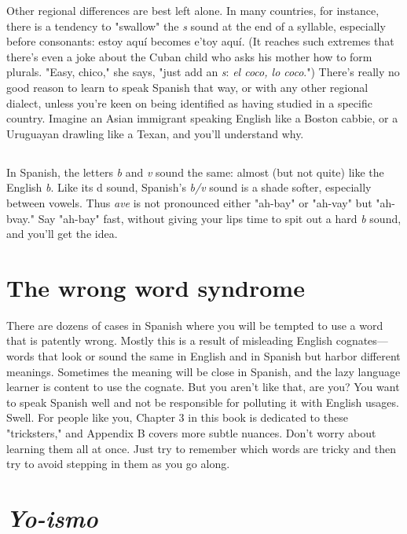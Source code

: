 \documentclass[14pt,a4paper,oneside]{memoir}
\begin{document}
Other regional differences are best left alone. In many
countries, for instance, there is a tendency to "swallow" the \emph{s} sound at
the end of a syllable, especially before consonants: estoy aquí becomes
e'toy aquí. (It reaches such extremes that there's even a joke about the
Cuban child who asks his mother how to form plurals. "Easy, chico,"
she says, "just add an \emph{s}: \emph{el coco, lo coco}.") There's really no good reason to learn to speak Spanish that way, or with any other regional dialect, unless you're keen on being identified as having studied in a specific country. Imagine an Asian immigrant speaking English like a
Boston cabbie, or a Uruguayan drawling like a Texan, and you'll understand why.

\subsection{}

In Spanish, the letters \emph{b} and \emph{v} sound the same: almost (but
not quite) like the English \emph{b}. Like its d sound, Spanish's \emph{b/v} sound is a
shade softer, especially between vowels. Thus \emph{ave} is not pronounced
either "ah-bay" or "ah-vay" but "ah-bvay." Say "ah-bay" fast, without
giving your lips time to spit out a hard \emph{b} sound, and you'll get the idea.

\section{The wrong word syndrome}

There are dozens of cases in Spanish where you will be
tempted to use a word that is patently wrong. Mostly this is a result of
misleading English cognates---words that look or sound the same in
English and in Spanish but harbor different meanings. Sometimes the
meaning will be close in Spanish, and the lazy language learner is content to use the cognate. But you aren't like that, are you? You want to
speak Spanish well and not be responsible for polluting it with English
usages. Swell. For people like you, Chapter 3 in this book is dedicated
to these "tricksters," and Appendix B covers more subtle nuances.
Don't worry about learning them all at once. Just try to remember
which words are tricky and then try to avoid stepping in them as you
go along.

\section{\emph{Yo-ismo}}
\end{document}

